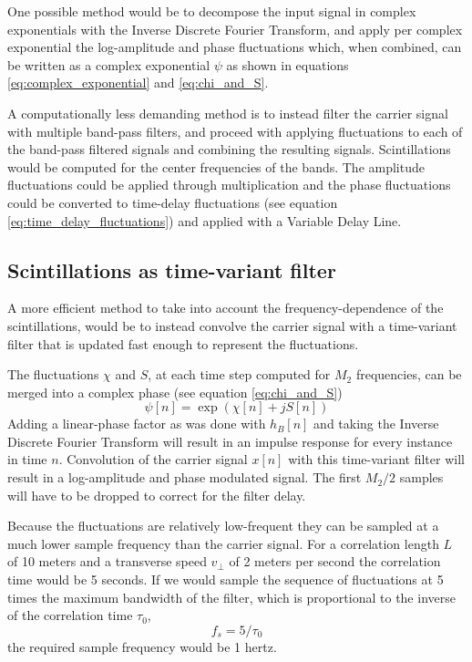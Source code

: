 One possible method would be to decompose the input signal in complex
exponentials with the Inverse Discrete Fourier Transform, and apply per complex
exponential the log-amplitude and phase fluctuations which, when combined, can be
written as a complex exponential $\psi$ as shown in equations
\eqref{eq:complex_exponential} and \eqref{eq:chi_and_S}.

A computationally less demanding method is to instead filter the carrier signal
with multiple band-pass filters, and proceed with applying fluctuations to each
of the band-pass filtered signals and combining the resulting signals.
Scintillations would be computed for the center frequencies of the bands. The amplitude
fluctuations could be applied through multiplication and the phase
fluctuations could be converted to time-delay fluctuations (see equation
\eqref{eq:time_delay_fluctuations}) and applied with a Variable Delay Line.


\subsection{Scintillations as time-variant filter}
A more efficient method to take into account the frequency-dependence
of the scintillations, would be to instead convolve the carrier signal with a
time-variant filter that is updated fast enough to represent the fluctuations.

The fluctuations $\chi$ and $S$, at each time step computed for $M_2$ frequencies, can be merged into a complex phase (see equation \eqref{eq:chi_and_S})
\begin{equation}
 \psi[n] = \exp\left({\chi[n] + jS[n] }\right)
\end{equation}
Adding a linear-phase factor as was done with $h_B[n]$ and taking the Inverse
Discrete Fourier Transform will result in an impulse response for every instance
in time $n$. Convolution of the carrier signal $x[n]$ with this time-variant
filter will result in a log-amplitude and phase modulated signal. The first
$M_2/2$ samples will have to be dropped to correct for the filter delay.

Because the fluctuations are relatively low-frequent they can be sampled at a
much lower sample frequency than the carrier signal. For a correlation length
$L$ of 10 meters and a transverse speed $v_{\bot}$ of 2 meters per second the
correlation time would be 5 seconds. If we would sample the sequence of
fluctuations at 5 times the maximum bandwidth of the filter, which is
proportional to the inverse of the correlation time $\tau_0$,
\begin{equation}
 f_s = 5 / \tau_0
\end{equation}
the required sample frequency would be 1 hertz.


